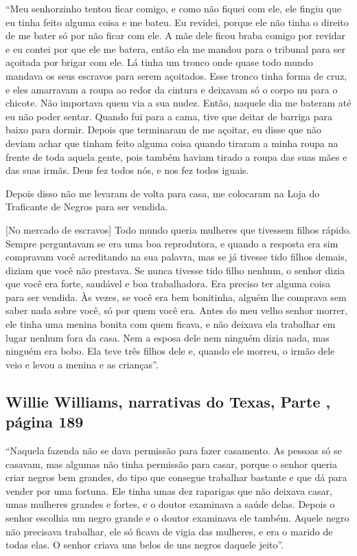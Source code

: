 ``Meu senhorzinho tentou ficar comigo, e como não fiquei com ele, ele
fingiu que eu tinha feito alguma coisa e me bateu. Eu revidei, porque
ele não tinha o direito de me bater só por não ficar com ele. A mãe dele
ficou braba comigo por revidar e eu contei por que ele me batera, então
ela me mandou para o tribunal para ser açoitada por brigar com ele. Lá
tinha um tronco onde quase todo mundo mandava os seus escravos para
serem açoitados. Esse tronco tinha forma de cruz, e eles amarravam a
roupa ao redor da cintura e deixavam só o corpo nu para o chicote. Não
importava quem via a sua nudez. Então, naquele dia me bateram até eu não
poder sentar. Quando fui para a cama, tive que deitar de barriga para
baixo para dormir. Depois que terminaram de me açoitar, eu disse que não
deviam achar que tinham feito alguma coisa quando tiraram a minha roupa
na frente de toda aquela gente, pois também haviam tirado a roupa das
suas mães e das suas irmãs. Deus fez todos nós, e nos fez todos iguais.

Depois disso não me levaram de volta para casa, me colocaram na Loja do
Traficante de Negros para ser vendida.

{[}No mercado de escravos{]} Todo mundo queria mulheres que
tivessem filhos rápido. Sempre perguntavam se era uma boa reprodutora, e
quando a resposta era sim compravam você acreditando na sua palavra, mas
se já tivesse tido filhos demais, diziam que você não prestava. Se nunca
tivesse tido filho nenhum, o senhor dizia que você era forte, saudável e
boa trabalhadora. Era preciso ter alguma coisa para ser vendida. Às
vezes, se você era bem bonitinha, alguém lhe comprava sem saber nada
sobre você, só por quem você era. Antes do meu velho senhor morrer, ele
tinha uma menina bonita com quem ficava, e não deixava ela trabalhar em
lugar nenhum fora da casa. Nem a esposa dele nem ninguém dizia nada, mas
ninguém era bobo. Ela teve três filhos dele e, quando ele morreu, o
irmão dele veio e levou a menina e as crianças''.

\subsection{Willie Williams, narrativas do Texas, Parte , página 189}
\label{ref293}

``Naquela fazenda
não se dava permissão para fazer casamento. As pessoas só se casavam,
mas algumas não tinha permissão para casar, porque o senhor queria criar
negros bem grandes, do tipo que consegue trabalhar bastante e que dá
para vender por uma fortuna. Ele tinha umas dez raparigas que não
deixava casar, umas mulheres grandes e fortes, e o doutor examinava a
saúde delas. Depois o senhor escolhia um negro grande e o doutor
examinava ele também. Aquele negro não precisava trabalhar, ele só
ficava de vigia das mulheres, e era o marido de todas elas. O senhor
criava uns belos de uns negros daquele jeito''.

